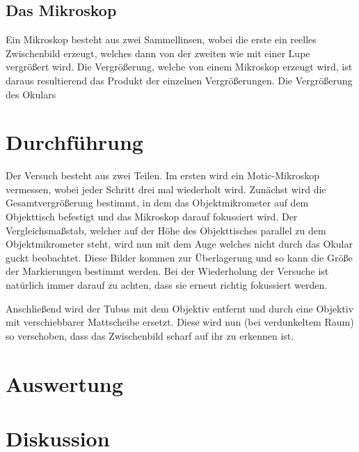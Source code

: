 \documentclass[12pt,a4paper,titlepage,headinclude,bibtotoc]{scrartcl}
\begin{document}
\subsection{Das Mikroskop}
Ein Mikroskop besteht aus zwei Sammellinsen, wobei die erste ein reelles Zwischenbild erzeugt, welches dann von der zweiten wie mit einer Lupe vergrößert wird.
Die Vergrößerung, welche von einem Mikroskop erzeugt wird, ist daraus resultierend das Produkt der einzelnen Vergrößerungen.
Die Vergrößerung des Okulars 

\section{Durchführung}
\label{sec:durchfuehrung}
Der Versuch besteht aus zwei Teilen.
Im ersten wird ein Motic-Mikroskop vermessen, wobei jeder Schritt drei mal wiederholt wird.
Zunächst wird die Gesamtvergrößerung bestimmt, in dem das Objektmikrometer auf dem Objekttisch befestigt und das Mikroskop darauf fokussiert wird.
Der Vergleichsmaßstab, welcher auf der Höhe des Objekttisches parallel zu dem Objektmikrometer steht, wird nun mit dem Auge welches nicht durch das Okular guckt beobachtet.
Diese Bilder kommen zur Überlagerung und so kann die Größe der Markierungen bestimmt werden.
Bei der Wiederholung der Versuche ist natürlich immer darauf zu achten, dass sie erneut richtig fokussiert werden.

Anschließend wird der Tubus mit dem Objektiv entfernt und durch eine Objektiv mit verschiebbarer Mattscheibe ersetzt.
Diese wird nun (bei verdunkeltem Raum) so verschoben, dass das Zwischenbild scharf auf ihr zu erkennen ist.


\section{Auswertung}
\label{sec:auswertung}

\section{Diskussion}
\label{sec:diskussion}



\end{document}
